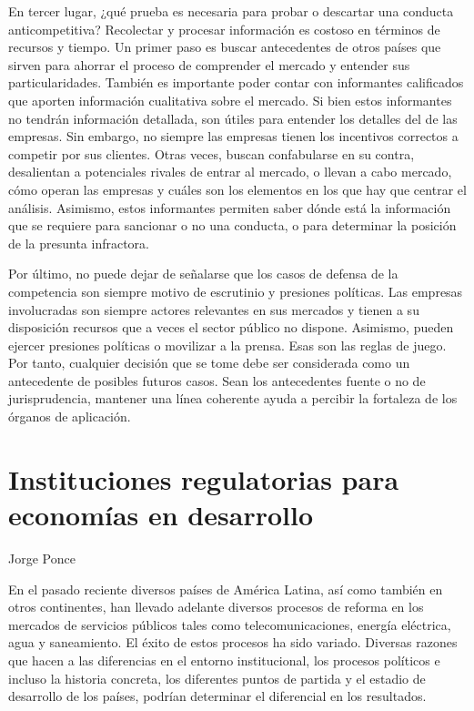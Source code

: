 \documentclass[
  12pt,
  spanish,
]{book}
\begin{document}
En tercer lugar, ¿qué prueba es necesaria para probar o descartar una
conducta anticompetitiva? Recolectar y procesar información es costoso
en términos de recursos y tiempo. Un primer paso es buscar antecedentes
de otros países que sirven para ahorrar el proceso de comprender el
mercado y entender sus particularidades. También es importante poder
contar con informantes calificados que aporten información cualitativa
sobre el mercado. Si bien estos informantes no tendrán información
detallada, son útiles para entender los detalles del de las empresas.
Sin embargo, no siempre las empresas tienen los incentivos correctos a
competir por sus clientes. Otras veces, buscan confabularse en su
contra, desalientan a potenciales rivales de entrar al mercado, o llevan
a cabo mercado, cómo operan las empresas y cuáles son los elementos en
los que hay que centrar el análisis. Asimismo, estos informantes
permiten saber dónde está la información que se requiere para sancionar
o no una conducta, o para determinar la posición de la presunta
infractora.

Por último, no puede dejar de señalarse que los casos de defensa de la
competencia son siempre motivo de escrutinio y presiones políticas. Las
empresas involucradas son siempre actores relevantes en sus mercados y
tienen a su disposición recursos que a veces el sector público no
dispone. Asimismo, pueden ejercer presiones políticas o movilizar a la
prensa. Esas son las reglas de juego. Por tanto, cualquier decisión que
se tome debe ser considerada como un antecedente de posibles futuros
casos. Sean los antecedentes fuente o no de jurisprudencia, mantener una
línea coherente ayuda a percibir la fortaleza de los órganos de
aplicación.

\hypertarget{instituciones-reg}{%
\chapter{Instituciones regulatorias para economías en
desarrollo}\label{instituciones-reg}}

Jorge Ponce

En el pasado reciente diversos países de América Latina, así como
también en otros continentes, han llevado adelante diversos procesos de
reforma en los mercados de servicios públicos tales como
telecomunicaciones, energía eléctrica, agua y saneamiento. El éxito de
estos procesos ha sido variado. Diversas razones que hacen a las
diferencias en el entorno institucional, los procesos políticos e
incluso la historia concreta, los diferentes puntos de partida y el
estadio de desarrollo de los países, podrían determinar el diferencial
en los resultados.
\end{document}
